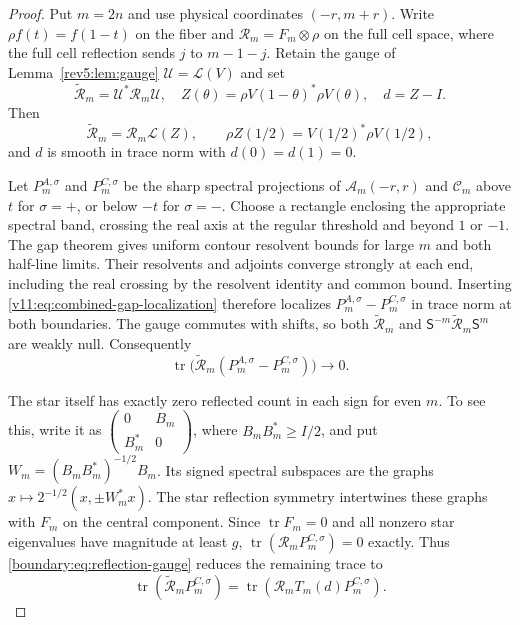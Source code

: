 \begin{proof}
Put $m=2n$ and use physical coordinates $(-r,m+r)$. Write
$\rho f(t)=f(1-t)$ on the fiber and
$\mathcal R_m=F_m\otimes\rho$ on the full cell space, where the full
cell reflection sends $j$ to $m-1-j$. Retain the gauge of Lemma~\ref{rev5:lem:gauge}
$\mathscr U=\mathcal L(V)$ and set
\[
 \widetilde{\mathcal R}_m=\mathscr U^*\mathcal R_m\mathscr U,
 \quad Z(\theta)=\rho V(1-\theta)^*\rho V(\theta),\quad d=Z-I.
\]
Then
\begin{equation}\label{boundary:eq:reflection-gauge}
 \widetilde{\mathcal R}_m=\mathcal R_m\mathcal L(Z),\qquad
 \rho Z(1/2)=V(1/2)^*\rho V(1/2),
\end{equation}
and $d$ is smooth in trace norm with $d(0)=d(1)=0$.

Let $P_m^{A,\sigma}$ and $P_m^{C,\sigma}$ be the sharp spectral
projections of $\mathscr A_m(-r,r)$ and $\mathscr C_m$ above $t$
for $\sigma=+$, or below $-t$ for $\sigma=-$.
Choose a rectangle enclosing the appropriate spectral band, crossing
the real axis at the regular threshold and beyond $1$ or $-1$.
The gap theorem gives uniform contour resolvent bounds for large $m$
and both half-line limits. Their resolvents and adjoints converge
strongly at each end, including the real crossing by the resolvent
identity and common bound. Inserting
\eqref{v11:eq:combined-gap-localization} therefore localizes
$P_m^{A,\sigma}-P_m^{C,\sigma}$ in trace norm at both boundaries.
The gauge commutes with shifts, so both
$\widetilde{\mathcal R}_m$ and
$\mathsf S^{-m}\widetilde{\mathcal R}_m\mathsf S^m$ are weakly null.
Consequently
\begin{equation}\label{boundary:eq:sharp-boundaries-vanish}
 \operatorname{tr}\bigl(\widetilde{\mathcal R}_m
 (P_m^{A,\sigma}-P_m^{C,\sigma})\bigr)\longrightarrow0.
\end{equation}

The star itself has exactly zero reflected count in each sign for even
$m$. To see this, write it as
$\left(\begin{smallmatrix}0&B_m\\B_m^*&0\end{smallmatrix}\right)$,
where $B_mB_m^*\ge I/2$, and put
$W_m=(B_mB_m^*)^{-1/2}B_m$.
Its signed spectral subspaces are the graphs
$x\mapsto2^{-1/2}(x,\pm W_m^*x)$.
The star reflection symmetry intertwines these graphs with $F_m$ on
the central component. Since $\operatorname{tr}F_m=0$ and all nonzero
star eigenvalues have magnitude at least $g$,
$\operatorname{tr}(\mathcal R_mP_m^{C,\sigma})=0$ exactly.
Thus \eqref{boundary:eq:reflection-gauge} reduces the remaining trace to
\[
 \operatorname{tr}(\widetilde{\mathcal R}_mP_m^{C,\sigma})
 =\operatorname{tr}(\mathcal R_mT_m(d)P_m^{C,\sigma}).
\]


\end{proof}
